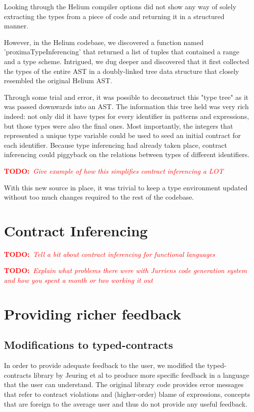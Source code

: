 \documentclass[10pt,a4paper]{article}
\newcommand{\annotate}[3]{
	\begin{scriptsize}
	\textcolor{#1}{\textbf{#2}~\textit{#3}}
	\end{scriptsize}\newline}
\newcommand{\todo}[1]{\annotate{red} {TODO:} {#1}}
\begin{document}
Looking through the Helium compiler options did not show any way of solely extracting the types from a piece of code and returning it in a structured manner.

However, in the Helium codebase, we discovered a function named 'proximaTypeInferencing' that returned a list of tuples that contained a range and a type scheme.
Intrigued, we dug deeper and discovered that it first collected the types of the entire AST in a doubly-linked tree data structure that closely resembled the original Helium AST.

Through some trial and error, it was possible to deconstruct this "type tree" as it was passed downwards into an AST.
The information this tree held was very rich indeed: not only did it have types for every identifier in patterns and expressions, but those types were also the final ones.
Most importantly, the integers that represented a unique type variable could be used to seed an initial contract for each identifier.
Because type inferencing had already taken place, contract inferencing could piggyback on the relations between types of different identifiers.

\todo{Give example of how this simplifies contract inferencing a LOT}

With this new source in place, it was trivial to keep a type environment updated without too much changes required to the rest of the codebase.

\section{Contract Inferencing}

\todo{Tell a bit about contract inferencing for functional languages}
\todo{Explain what problems there were with Jurriens code generation system and how you spent a month or two working it out}

\section{Providing richer feedback}
\label{providingricherfeedback}

\subsection{Modifications to typed-contracts}
\label{modificationstotypedcontracts}
In order to provide adequate feedback to the user, we modified the typed-contracts library by Jeuring et al to produce more specific feedback in a language that the user can understand.
The original library code provides error messages that refer to contract violations and (higher-order) blame of expressions, concepts that are foreign to the average user and thus do not provide any useful feedback.
\end{document}
